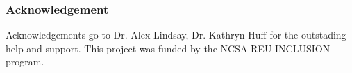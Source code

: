 \begin{frame}
  \frametitle{Acknowledgement}
        Acknowledgements go to Dr. Alex Lindsay, Dr. Kathryn Huff for the outstading help and support.
        This project was funded by the NCSA REU INCLUSION program.
    \end{frame}
